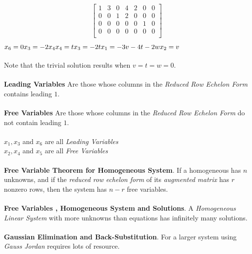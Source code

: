 \documentclass[a4paper, 12pt]{article}
\begin{document}
\[ \left[
\begin{array}{ccccccc} 
1  &  3  &  0 &  4  &  2 &  0 & 0\\
0  &  0  &  1 &  2  &  0 &  0 & 0\\
0  &  0  &  0 &  0  &  0 &  1 & 0\\ 
0  &  0  &  0 &   0 &  0 &  0 & 0\\
\end{array} 
\right] \] 

$
x_6 = 0 \\
x_3 = -2x_4 \\
x_4 = t \\
x_3 = -2t \\
x_1 = -3v -4t - 2w \\
x_2 = v
$
\\
\\
Note that the trivial solution results when $v = t = w = 0$.
\\
\\
\textbf{Leading Variables} Are those whose columns in the 
\textit{Reduced Row Echelon Form} contains leading $1$.
\\
\\
\textbf{Free Variables} Are those whose columns in the 
\textit{Reduced Row Echelon Form} do not contain leading $1$.
\\
\\
$x_1, x_3$ and $x_6$ are all \textit{Leading Variables}
\\
$x_2, x_4$ and $x_5$ are all \textit{Free Variables}
\\
\\
\textbf{Free Variable Theorem for Homogeneous System}. If a homogeneous has 
$n$ unknowns, and if the \textit{reduced row echelon form} of its 
\textit{augmented matrix} has $r$ nonzero rows, then the system has $n - r$
free variables.
\\
\\
\textbf{Free Variables , Homogeneous System and Solutions}. A 
\textit{Homogeneous Linear System} with more unknowns than equations
has infinitely many solutions.
\\
\\
\textbf{Gaussian Elimination and Back-Substitution}. For a larger system
using \textit{Gauss Jordan} requires lots of resource. 
\end{document}
